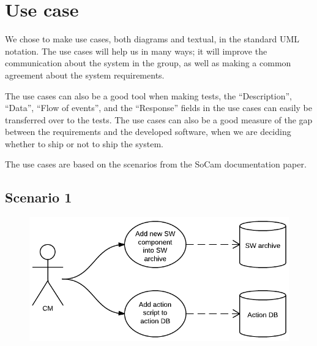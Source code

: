 \chapter{Use case}

We chose to make use cases, both diagrams and textual, in the standard UML notation. 
The use cases will help us in many ways; it will improve the communication about the 
system in the group, as well as making a common agreement about the system requirements.

The use cases can also be a good tool when making tests, the “Description”, “Data”, 
“Flow of events”, and the “Response” fields in the use cases can easily be 
transferred over to the tests. The use cases can also be a good measure of the gap 
between the requirements and the developed software, when we are deciding whether to 
ship or not to ship the system.

The use cases are based on the scenarios from the SoCam documentation paper. 


\clearpage

\section{Scenario 1}

	\begin{figure}[H]
		\includegraphics[width=\textwidth]{pics/usecase1.png}
	\end{figure}

